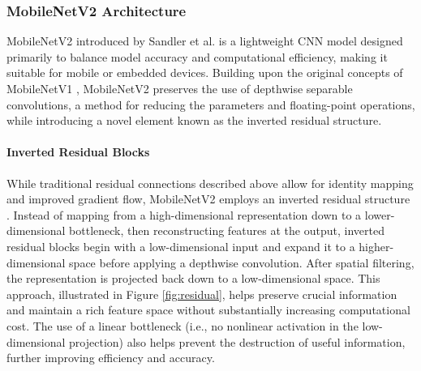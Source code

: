 
\subsubsection{MobileNetV2 Architecture}
\label{sec:mobilenet}
MobileNetV2 introduced by Sandler et al. \cite{sandler2018mobilenetv2} is a lightweight CNN model designed primarily to balance model accuracy and computational efficiency, making it suitable for mobile or embedded devices. Building upon the original concepts of MobileNetV1 \cite{howard2017mobilenetsefficientconvolutionalneural}, MobileNetV2 preserves the use of depthwise separable convolutions, a method for reducing the parameters and floating-point operations, while introducing a novel element known as the inverted residual structure. 


\paragraph{Inverted Residual Blocks}
While traditional residual connections described above allow for identity mapping and improved gradient flow, MobileNetV2 employs an inverted residual structure \cite{sandler2018mobilenetv2}. Instead of mapping from a high-dimensional representation down to a lower-dimensional bottleneck, then reconstructing features at the output, inverted residual blocks begin with a low-dimensional input and expand it to a higher-dimensional space before applying a depthwise convolution. After spatial filtering, the representation is projected back down to a low-dimensional space. This approach, illustrated in Figure \ref{fig:residual}, helps preserve crucial information and maintain a rich feature space without substantially increasing computational cost. The use of a linear bottleneck (i.e., no nonlinear activation in the low-dimensional projection) also helps prevent the destruction of useful information, further improving efficiency and accuracy.  

